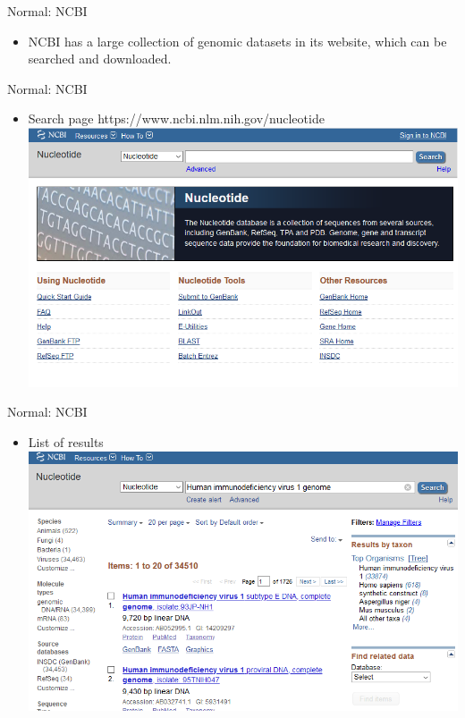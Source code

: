 \documentclass{beamer}
\begin{document}
  \begin{frame}{Normal: NCBI}
        \begin{itemize}
            \item NCBI has a large collection of genomic datasets in its website, which can be searched and downloaded.
        \end{itemize}
    \end{frame}
    \begin{frame}{Normal: NCBI}
        \begin{itemize}
            \item Search page https://www.ncbi.nlm.nih.gov/nucleotide
            \includegraphics[scale=0.5]{ncbi1.png}
        \end{itemize}
    \end{frame}
    \begin{frame}{Normal: NCBI}
        \begin{itemize}
            \item List of results
            \includegraphics[scale=0.5]{ncbi2.png}
        \end{itemize}
    \end{frame}
\end{document}
